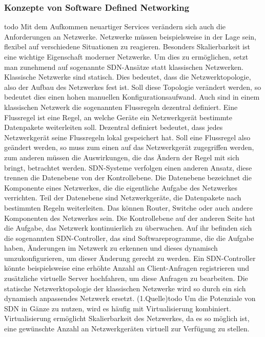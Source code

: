 \subsubsection{Konzepte von Software Defined Networking}

todo
Mit dem Aufkommen neuartiger Services verändern sich auch die Anforderungen an Netzwerke. Netzwerke müssen beispielsweise in der Lage sein, flexibel auf verschiedene Situationen zu reagieren. 
Besonders Skalierbarkeit ist eine wichtige Eigenschaft moderner Netzwerke. Um dies zu ermöglichen, setzt man zunehmend auf sogenannte \ac{SDN}-Ansätze statt klassischen Netzwerken. 
Klassische Netzwerke sind statisch. Dies bedeutet, dass die Netzwerktopologie, also der Aufbau des Netzwerkes fest ist. Soll diese Topologie verändert werden, so bedeutet dies einen hohen manuellen Konfigurationsaufwand. 
Auch sind in einem klassischen Netzwerk die sogenannten Flussregeln dezentral definiert. Eine Flussregel ist eine Regel, an welche Geräte ein Netzwerkgerät bestimmte Datenpakete weiterleiten soll. 
Dezentral definiert bedeutet, dass jedes Netzwerkgerät seine Flussregeln lokal gespeichert hat. Soll eine Flussregel also geändert werden, so muss zum einen auf das Netzwerkgerät zugegriffen werden, 
zum anderen müssen die Auswirkungen, die das Ändern der Regel mit sich bringt, betrachtet werden. \ac{SDN}-Systeme verfolgen einen anderen Ansatz, diese trennen die Datenebene von der Kontrollebene. 
Die Datenebene bezeichnet die Komponente eines Netzwerkes, die die eigentliche Aufgabe des Netzwerkes verrichten. Teil der Datenebene sind Netzwerkgeräte, die Datenpakete nach bestimmten Regeln weiterleiten. 
Das können Router, Switche oder auch andere Komponenten des Netzwerkes sein. Die Kontrollebene auf der anderen Seite hat die Aufgabe, das Netzwerk kontinuierlich zu überwachen. 
Auf ihr befinden sich die sogenannten \ac{SDN}-Controller, das sind Softwareprogramme, die die Aufgabe haben, Änderungen im Netzwerk zu erkennen und dieses dynamisch umzukonfigurieren, um dieser Änderung gerecht zu werden. 
Ein \ac{SDN}-Controller könnte beispielsweise eine erhöhte Anzahl an Client-Anfragen registrieren und zusätzliche virtuelle Server hochfahren, um diese Anfragen zu bearbeiten. 
Die statische Netzwerktopologie der klassischen Netzwerke wird so durch ein sich dynamisch anpassendes Netzwerk ersetzt. (1.Quelle)todo Um die Potenziale von \ac{SDN} in Gänze zu nutzen, 
wird es häufig mit Virtualisierung kombiniert. Virtualisierung ermöglicht Skalierbarkeit des Netzwerkes, da es so möglich ist, eine gewünschte Anzahl an Netzwerkgeräten virtuell zur Verfügung zu stellen. 
